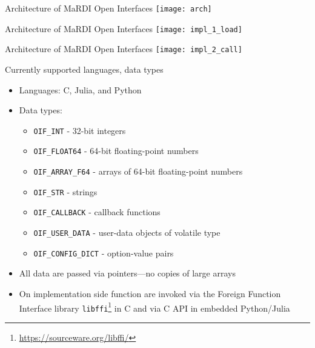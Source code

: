 \documentclass[10pt, aspectratio=169, progressbar=frametitle]{beamer}
\begin{document}
\begin{frame}{Architecture of MaRDI Open Interfaces}
  \centering
  \texttt{[image: arch]}
\end{frame}

\begin{frame}{Architecture of MaRDI Open Interfaces}
  \centering
  \texttt{[image: impl\_1\_load]}
\end{frame}

\begin{frame}{Architecture of MaRDI Open Interfaces}
  \centering
  \texttt{[image: impl\_2\_call]}
\end{frame}

\begin{frame}{Currently supported languages, data types}
  \begin{itemize}
    \item Languages: C, Julia, and Python
    \item Data types:
          \begin{itemize}
            \item \texttt{OIF\_INT} - 32-bit integers
            \item \texttt{OIF\_FLOAT64} - 64-bit floating-point numbers
            \item \texttt{OIF\_ARRAY\_F64} - arrays of 64-bit floating-point numbers
            \item \texttt{OIF\_STR} - strings
            \item \texttt{OIF\_CALLBACK} - callback functions
            \item \texttt{OIF\_USER\_DATA} - user-data objects of volatile type
            \item \texttt{OIF\_CONFIG\_DICT} - option-value pairs
          \end{itemize}
    \item All data are passed via pointers---no copies of large arrays
    \item On implementation side function are invoked via
          the Foreign Function Interface library \texttt{libffi}\footnote{\url{https://sourceware.org/libffi/}}
          in C and via C API in embedded Python/Julia
  \end{itemize}

\end{frame}
\end{document}
